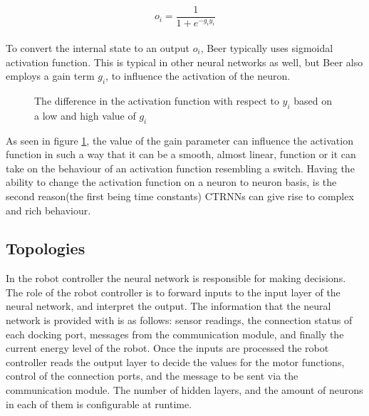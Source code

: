 \begin{equation}
o_i = \frac{1}{1 + e^{-g_{i}y_{i}}}
\end{equation}
\\
To convert the internal state to an output $o_i$, Beer typically uses sigmoidal activation function.
This is typical in other neural networks as well, but Beer also employs a gain term $g_i$, to influence the activation of the neuron.
\\
\begin{figure}[H]
	\centering
{}
	\caption{The difference in the activation function with respect to $y_i$ based on a low and high value of $g_i$}
	\label{CTRNN-gGraph}
\end{figure}

As seen in figure \ref{CTRNN-gGraph}, the value of the gain parameter can influence the activation function in such a way that it can be a smooth, almost linear, function or it can take on the behaviour of an activation function resembling a switch.
Having the ability to change the activation function on a neuron to neuron basis, is the second reason(the first being time constants) CTRNNs can give rise to complex and rich behaviour.




\subsection{Topologies}
In the robot controller the neural network is responsible for making decisions.
The role of the robot controller is to forward inputs to the input layer of the neural network, and interpret the output.
The information that the neural network is provided with is as follows: sensor readings, the connection status of each docking port, messages from the communication module, and finally the current energy level of the robot.
Once the inputs are processed the robot controller reads the output layer to decide the values for the motor functions, control of the connection ports, and the message to be sent via the communication module.
The number of hidden layers, and the amount of neurons in each of them is configurable at runtime.
	
